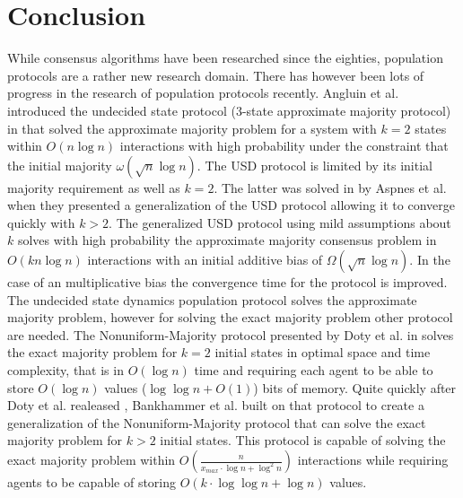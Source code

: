 \section{Conclusion} 
While consensus algorithms have been researched since the eighties, population protocols are a rather new research domain. There has however been lots of progress in the research of population protocols recently. Angluin et al. introduced the undecided state protocol (3-state approximate majority protocol) in \cite{angluinSimplePopulationProtocol2008} that solved the approximate majority problem for a system with $k = 2$ states within $O(n \log n)$ interactions with high probability under the constraint that the initial majority $\omega(\sqrt{n} \log n)$. The USD protocol is limited by its initial majority requirement as well as $k = 2$. The latter was solved in \cite{AspnesFastConverganceOfKOpinion2023} by Aspnes et al. when they presented a generalization of the USD protocol allowing it to converge quickly with $k > 2$. The generalized USD protocol using mild assumptions about $k$ solves with high probability the approximate majority consensus problem in $O(k n \log n)$ interactions with an initial additive bias of $\Omega(\sqrt{n} \log n)$. In the case of an multiplicative bias the convergence time for the protocol is improved. The undecided state dynamics population protocol solves the approximate majority problem, however for solving the exact majority problem other protocol are needed. The Nonuniform-Majority protocol presented by Doty et al. in \cite{dotyTimeSpaceOptimal2022} solves the exact majority problem for $k = 2$ initial states in optimal space and time complexity, that is in $O(\log n)$ time and requiring each agent to be able to store $O(\log n)$ values ($\log \log n + O(1)$) bits of memory. Quite quickly after Doty et al. realeased \cite{dotyTimeSpaceOptimal2022}, Bankhammer et al. \cite{bankhamerPopulationProtocolsExact2022} built on that protocol to create a generalization of the Nonuniform-Majority protocol that can solve the exact majority problem for $k > 2$ initial states. This protocol is capable of solving the exact majority problem within $O(\frac{n}{x_{max} \cdot \log n + \log^2 n})$ interactions while requiring agents to be capable of storing $O(k \cdot \log \log n + \log n)$ values. 


